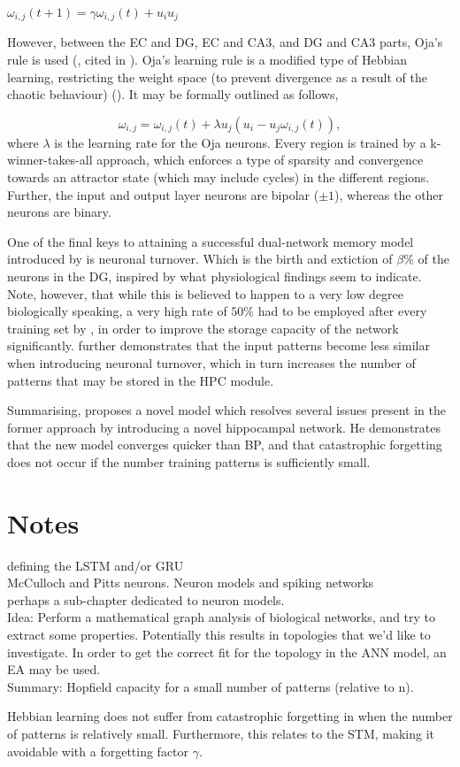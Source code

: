 \begin{center}
\begin{math}
    \omega_{i,j}(t+1) = \gamma \omega_{i,j}(t) + u_i u_j
\end{math}
\end{center}

However, between the EC and DG, EC and CA3, and DG and CA3 parts, Oja's rule is used (\cite{Hertz1991}, cited in \cite{Hattori2014}). Oja's learning rule is a modified type of Hebbian learning, restricting the weight space (to prevent divergence as a result of the chaotic behaviour) (\cite{}). It may be formally outlined as follows,

\begin{equation}\label{ojas_rule}
    \omega_{i,j} = \omega_{i,j}(t) + \lambda u_j (u_i - u_j \omega_{i,j}(t)),
\end{equation}
where $\lambda$ is the learning rate for the Oja neurons. Every region is trained by a k-winner-takes-all approach, which enforces a type of sparsity and convergence towards an attractor state (which may include cycles) in the different regions. Further, the input and output layer neurons are bipolar ($\pm 1$), whereas the other neurons are binary.

One of the final keys to attaining a successful dual-network memory model introduced by \cite{Hattori2014} is neuronal turnover. Which is the birth and extiction of $\beta \%$ of the neurons in the DG, inspired by what physiological findings seem to indicate. Note, however, that while this is believed to happen to a very low degree biologically speaking, a very high rate of $50 \%$ had to be employed after every training set by \cite{Hattori2014}, in order to improve the storage capacity of the network significantly. \cite{Hattori2014} further demonstrates that the input patterns become less similar when introducing neuronal turnover, which in turn increases the number of patterns that may be stored in the HPC module. 

Summarising, \cite{Hattori2014} proposes a novel model which resolves several issues present in the former approach by introducing a novel hippocampal network. He demonstrates that the new model converges quicker than BP, and that catastrophic forgetting does not occur if the number training patterns is sufficiently small. 

\section{Notes}
defining the LSTM and/or GRU
\\
McCulloch and Pitts neurons. Neuron models and spiking networks
\\
perhaps a sub-chapter dedicated to neuron models.
\\
Idea: Perform a mathematical graph analysis of biological networks, and try to extract some properties. Potentially this results in topologies that we'd like to investigate. In order to get the correct fit for the topology in the ANN model, an EA may be used.
\\
Summary: Hopfield capacity for a small number of patterns (relative to n).

Hebbian learning does not suffer from catastrophic forgetting in \cite{Hattori2014} when the number of patterns is relatively small. Furthermore, this relates to the STM, making it avoidable with a forgetting factor $\gamma$.


\cleardoublepage